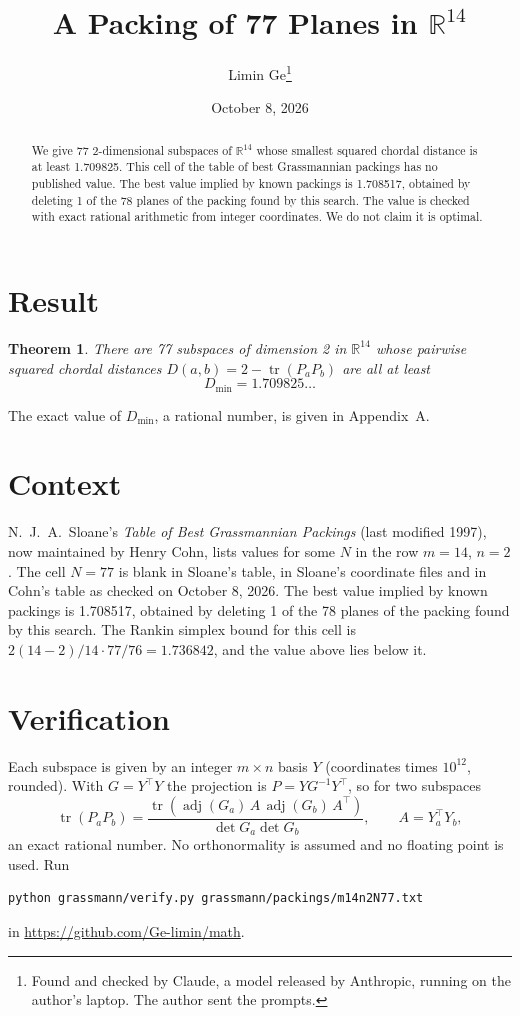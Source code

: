 \documentclass[11pt,a4paper]{article}
\title{A Packing of 77 Planes in $\mathbb{R}^{14}$}
\author{Limin Ge\thanks{Found and checked by Claude, a model released by Anthropic, running on the author's laptop. The author sent the prompts.}}
\date{October 8, 2026}
\newtheorem*{theorem}{Theorem}
\begin{document}
\maketitle
\begin{abstract}
We give 77 2-dimensional subspaces of $\mathbb{R}^{14}$ whose smallest squared chordal distance is at least 1.709825. This cell of the table of best Grassmannian packings has no published value. The best value implied by known packings is 1.708517, obtained by deleting 1 of the 78 planes of the packing found by this search. The value is checked with exact rational arithmetic from integer coordinates. We do not claim it is optimal.
\end{abstract}

\section{Result}
\begin{theorem}
There are 77 subspaces of dimension 2 in $\mathbb{R}^{14}$ whose pairwise squared chordal distances $D(a,b) = 2 - \operatorname{tr}(P_aP_b)$ are all at least
\[ D_{\min} = 1.709825\ldots \]
\end{theorem}
The exact value of $D_{\min}$, a rational number, is given in Appendix~A.


\section{Context}
N.~J.~A.~Sloane's \emph{Table of Best Grassmannian Packings} (last modified 1997), now maintained by Henry Cohn, lists values for some $N$ in the row $m=14$, $n=2$. The cell $N=77$ is blank in Sloane's table, in Sloane's coordinate files and in Cohn's table as checked on October 8, 2026. The best value implied by known packings is 1.708517, obtained by deleting 1 of the 78 planes of the packing found by this search. The Rankin simplex bound for this cell is $2(14-2)/14\cdot 77/76 = 1.736842$, and the value above lies below it.


\section{Verification}
Each subspace is given by an integer $m\times n$ basis $Y$ (coordinates times $10^{12}$, rounded). With $G=Y^\top Y$ the projection is $P=YG^{-1}Y^\top$, so for two subspaces
\[ \operatorname{tr}(P_aP_b)=\frac{\operatorname{tr}(\operatorname{adj}(G_a)\,A\,\operatorname{adj}(G_b)\,A^\top)}{\det G_a\det G_b},\qquad A=Y_a^\top Y_b, \]
an exact rational number. No orthonormality is assumed and no floating point is used. Run
\begin{verbatim}
python grassmann/verify.py grassmann/packings/m14n2N77.txt
\end{verbatim}
in \url{https://github.com/Ge-limin/math}.
\end{document}
